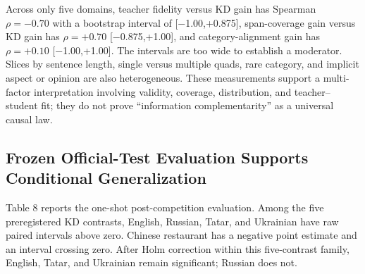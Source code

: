 Across only five domains, teacher fidelity versus KD gain has Spearman
\(\rho=-0.70\) with a bootstrap interval of {[}−1.00,+0.875{]},
span-coverage gain versus KD gain has \(\rho=+0.70\) {[}−0.875,+1.00{]},
and category-alignment gain has \(\rho=+0.10\) {[}−1.00,+1.00{]}. The
intervals are too wide to establish a moderator. Slices by sentence
length, single versus multiple quads, rare category, and implicit aspect
or opinion are also heterogeneous. These measurements support a
multi-factor interpretation involving validity, coverage, distribution,
and teacher--student fit; they do not prove ``information
complementarity'' as a universal causal law.

\subsection{Frozen Official-Test Evaluation Supports Conditional
Generalization}\label{frozen-official-test-evaluation-supports-conditional-generalization}

Table 8 reports the one-shot post-competition evaluation. Among the five
preregistered KD contrasts, English, Russian, Tatar, and Ukrainian have
raw paired intervals above zero. Chinese restaurant has a negative point
estimate and an interval crossing zero. After Holm correction within
this five-contrast family, English, Tatar, and Ukrainian remain
significant; Russian does not.

